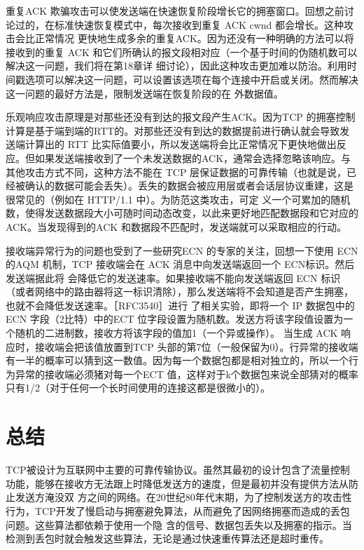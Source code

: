 重复ACK 欺骗攻击可以使发送端在快速恢复阶段增长它的拥塞窗口。回想之前讨论过的，在标准快速恢复模式中，每次接收到重复 ACK cwnd 都会增长。这种攻击会比正常情况
更快地生成多余的重复ACK。因为还没有一种明确的方法可以将接收到的重复 ACK 和它们所确认的报文段相对应（一个基于时间的伪随机数可以解决这一问题，我们将在第18章详
细讨论），因此这种攻击更加难以防治。利用时间戳选项可以解决这一问题，可以设置该选项在每个连接中开启或关闭。然而解决这一问题的最好方法是，限制发送端在恢复阶段的在
外数据值。

乐观响应攻击原理是对那些还没有到达的报文段产生ACK。因为TCP 的拥塞控制计算是基于端到端的RTT的。对那些还没有到达的数据提前进行确认就会导致发送端计算出的
RTT 比实际值要小，所以发送端将会比正常情况下更快地做出反应。但如果发送端接收到了一个未发送数据的ACK，通常会选择忽略该响应。与其他攻击方式不同，这种方法不能在
TCP 层保证数据的可靠传输（也就是说，已经被确认的数据可能会丢失）。丢失的数据会被应用层或者会话层协议重建，这是很常见的（例如在 HTTP/1.1 中）。为防范这类攻击，可定
义一个可累加的随机数，使得发送数据段大小可随时间动态改变，以此来更好地匹配数据段和它对应的ACK。当发现得到的ACK 和数据段不匹配时，发送端就可以采取相应的行动。

接收端异常行为的问题也受到了一些研究ECN 的专家的关注，回想一下使用 ECN的AQM 机制，TCP 接收端会在 ACK 消息中向发送端返回一个 ECN标识。然后发送端据此将
会降低它的发送速率。如果接收端不能向发送端返回 ECN 标识（或者网络中的路由器将这一标识清除），那么发送端将不会知道是否产生拥塞，也就不会降低发送速率。［RFC3540］进行
了相关实验，即将一个 IP 数据包中的ECN 字段（2比特）中的ECT 位字段设置为随机数。发送方将该字段值设置为一个随机的二进制数，接收方将该字段的值加1（一个异或操作）。
当生成 ACK 响应时，接收端会把该值放置到TCP 头部的第7位（一般保留为0）。行异常的接收端有一半的概率可以猜到这一数值。因为每一个数据包都是相对独立的，所以一个行
为异常的接收端必须猪对每一个ECT 值，这样对于k个数据包来说全部猜对的概率只有1/2（对于任何一个长时间使用的连接这都是很微小的）。

\section{总结}
TCP被设计为互联网中主要的可靠传输协议。虽然其最初的设计包含了流量控制功能，能够在接收方无法跟上时降低发送方的速度，但是最初并没有提供方法从防止发送方淹没双
方之间的网络。在20世纪80年代末期，为了控制发送方的攻击性行为，TCP开发了慢启动与拥塞避免算法，从而避免了因网络拥塞而造成的丢包问题。这些算法都依赖于使用一个隐
含的信号、数据包丢失以及拥塞的指示。当检测到丢包时就会触发这些算法，无论是通过快速重传算法还是超时重传。

